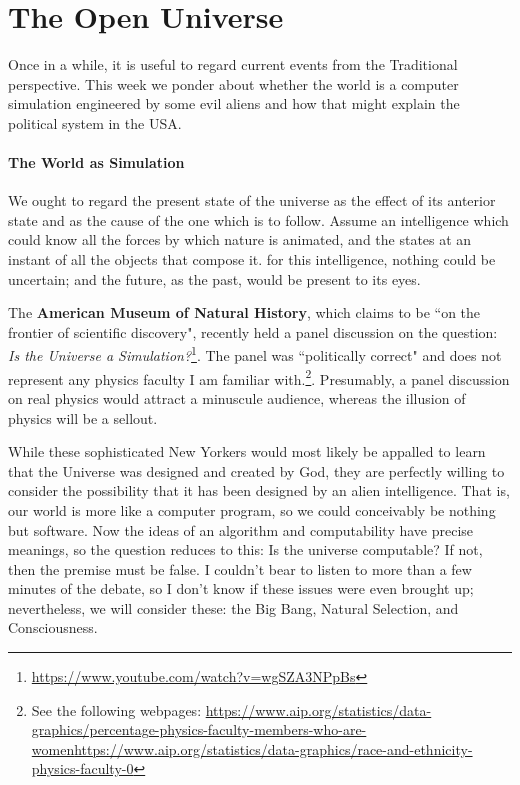 \section{The Open Universe}

\label{sec:TheOpenUniverse}

Once in a while, it is useful to regard current events from the Traditional perspective. This week we ponder about whether the world is a computer simulation engineered by some evil aliens and how that might explain the political system in the USA.

\paragraph{The World as Simulation}
\begin{quotex}
We ought to regard the present state of the universe as the effect of its anterior state and as the cause of the one which is to follow. Assume an intelligence which could know all the forces by which nature is animated, and the states at an instant of all the objects that compose it. for this intelligence, nothing could be uncertain; and the future, as the past, would be present to its eyes. 

\end{quotex}
The \textbf{American Museum of Natural History}, which claims to be ``on the frontier of scientific discovery", recently held a panel discussion on the question: \emph{Is the Universe a Simulation?}\footnote{\url{https://www.youtube.com/watch?v=wgSZA3NPpBs}}. The panel was ``politically correct" and does not represent any physics faculty I am familiar with.\footnote{See the following webpages: \url{https://www.aip.org/statistics/data-graphics/percentage-physics-faculty-members-who-are-women}\newline\url{https://www.aip.org/statistics/data-graphics/race-and-ethnicity-physics-faculty-0}}. Presumably, a panel discussion on real physics would attract a minuscule audience, whereas the illusion of physics will be a sellout.

While these sophisticated New Yorkers would most likely be appalled to learn that the Universe was designed and created by God, they are perfectly willing to consider the possibility that it has been designed by an alien intelligence. That is, our world is more like a computer program, so we could conceivably be nothing but software. Now the ideas of an algorithm and computability have precise meanings, so the question reduces to this: Is the universe computable? If not, then the premise must be false. I couldn't bear to listen to more than a few minutes of the debate, so I don't know if these issues were even brought up; nevertheless, we will consider these: the Big Bang, Natural Selection, and Consciousness.

